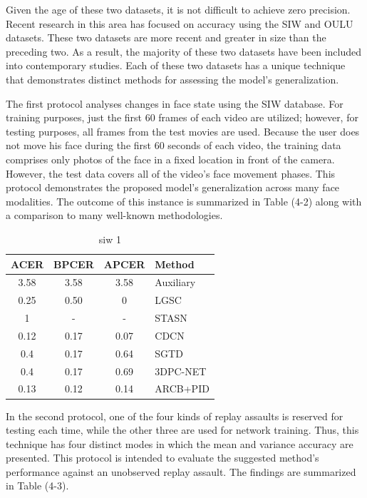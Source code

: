 \documentclass[journal]{IEEEtran}
\begin{document}
Given the age of these two datasets, it is not difficult to achieve zero precision. Recent research in this area has focused on accuracy using the SIW and OULU datasets. These two datasets are more recent and greater in size than the preceding two. As a result, the majority of these two datasets have been included into contemporary studies. Each of these two datasets has a unique technique that demonstrates distinct methods for assessing the model's generalization.

The first protocol analyses changes in face state using the SIW database. For training purposes, just the first 60 frames of each video are utilized; however, for testing purposes, all frames from the test movies are used. Because the user does not move his face during the first 60 seconds of each video, the training data comprises only photos of the face in a fixed location in front of the camera. However, the test data covers all of the video's face movement phases. This protocol demonstrates the proposed model's generalization across many face modalities. The outcome of this instance is summarized in Table (4-2) along with a comparison to many well-known methodologies.

\begin{table}[h]
	\caption{siw 1}
	\label{tab:siw1}
	\centering
	\begin{tabular}{|c|c|c|l|}
		\hline ACER & BPCER & APCER & Method                \\
		\hline 3.58 & 3.58  & 3.58  & \cite{liu2018learning} Auxiliary    \\
		\hline 0.25 & 0.50  & 0     & \cite{feng2020learning} LGSC         \\
		\hline 1    & -     & -     & \cite{yang2019face} STASN       \\
		\hline 0.12 & 0.17  & 0.07  & \cite{yu2020searching} CDCN             \\
		\hline 0.4  & 0.17  & 0.64  & \cite{wang2020deep} SGTD      \\
		\hline 0.4  & 0.17  & 0.69  & \cite{li20203dpc}   3DPC-NET   \\
		\hline 0.13 & 0.12  & 0.14  & ARCB+PID    \\ 
		\hline         
	\end{tabular}
\end{table}

In the second protocol, one of the four kinds of replay assaults is reserved for testing each time, while the other three are used for network training. Thus, this technique has four distinct modes in which the mean and variance accuracy are presented. This protocol is intended to evaluate the suggested method's performance against an unobserved replay assault. The findings are summarized in Table (4-3).
\end{document}
